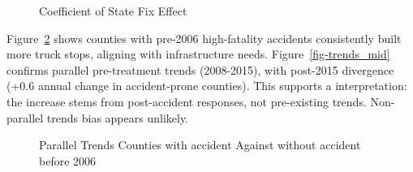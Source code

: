 \documentclass[
  12pt]{article}
\begin{document}
\begin{figure}


\caption{\label{fig-StateZoning}Coefficient of State Fix Effect}

\end{figure}%

Figure~\ref{fig-trends_past} shows counties with pre-2006 high-fatality
accidents consistently built more truck stops, aligning with
infrastructure needs. Figure~\ref{fig-trends_mid} confirms parallel
pre-treatment trends (2008-2015), with post-2015 divergence (+0.6 annual
change in accident-prone counties). This supports a interpretation: the
increase stems from post-accident responses, not pre-existing trends.
Non-parallel trends bias appears unlikely.

\begin{figure}


\caption{\label{fig-trends_past}Parallel Trends Counties with accident
Against without accident before 2006}

\end{figure}%
\end{document}

